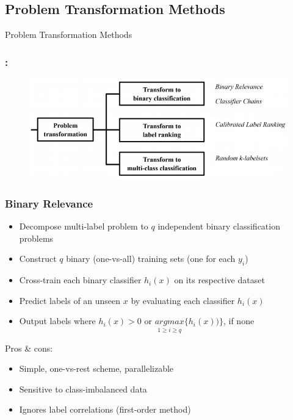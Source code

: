 \documentclass{beamer}
\begin{document}
\subsection{Problem Transformation Methods}
\begin{frame}
\Huge{\centerline{Problem Transformation Methods}}
\end{frame}
\begin{frame}
\frametitle{\insertsection : \insertsubsection}
\begin{figure}
\begin{center}
\includegraphics[scale = 0.7]{images/pt.png}
\end{center}
\end{figure}
\end{frame}
\begin{frame}
\frametitle{Binary Relevance}

\begin{itemize}
\item Decompose multi-label problem to $q$ independent binary classification problems
\item Construct $q$ binary (one-vs-all) training sets (one for each $y_i$)
\item Cross-train each binary classifier $h_i(x)$ on its respective dataset

\item Predict labels of an unseen $x$ by evaluating each classifier $h_i(x)$
\item Output labels where  $h_i(x) > 0$ or $\underset{1 \geq i \geq q}{argmax} \{h_i(x))\}$, if none
\end{itemize}

Pros \& cons:
\begin{itemize}
\item Simple, one-vs-rest scheme, parallelizable
\item Sensitive to class-imbalanced data
\item Ignores label correlations (first-order method)
\end{itemize}

\end{frame}
\end{document}
